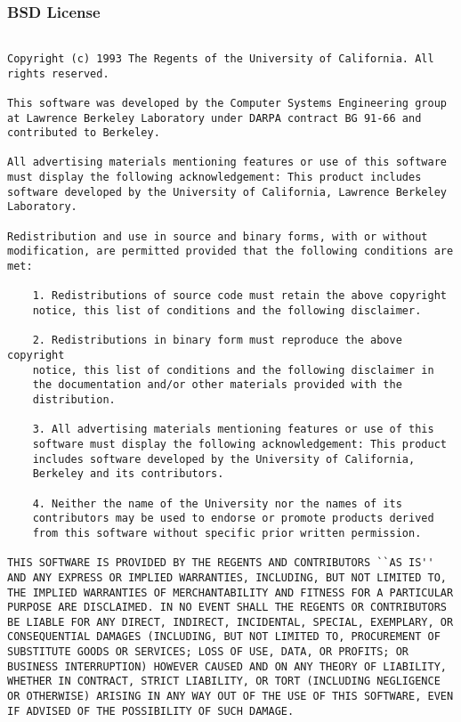 \newpage

\subsubsection{BSD License}

\begin{verbatim}

Copyright (c) 1993 The Regents of the University of California. All
rights reserved.

This software was developed by the Computer Systems Engineering group
at Lawrence Berkeley Laboratory under DARPA contract BG 91-66 and
contributed to Berkeley.

All advertising materials mentioning features or use of this software
must display the following acknowledgement: This product includes
software developed by the University of California, Lawrence Berkeley
Laboratory.

Redistribution and use in source and binary forms, with or without
modification, are permitted provided that the following conditions are
met:

    1. Redistributions of source code must retain the above copyright
    notice, this list of conditions and the following disclaimer.

    2. Redistributions in binary form must reproduce the above copyright
    notice, this list of conditions and the following disclaimer in
    the documentation and/or other materials provided with the
    distribution.

    3. All advertising materials mentioning features or use of this
    software must display the following acknowledgement: This product
    includes software developed by the University of California,
    Berkeley and its contributors.

    4. Neither the name of the University nor the names of its
    contributors may be used to endorse or promote products derived
    from this software without specific prior written permission.

THIS SOFTWARE IS PROVIDED BY THE REGENTS AND CONTRIBUTORS ``AS IS''
AND ANY EXPRESS OR IMPLIED WARRANTIES, INCLUDING, BUT NOT LIMITED TO,
THE IMPLIED WARRANTIES OF MERCHANTABILITY AND FITNESS FOR A PARTICULAR
PURPOSE ARE DISCLAIMED. IN NO EVENT SHALL THE REGENTS OR CONTRIBUTORS
BE LIABLE FOR ANY DIRECT, INDIRECT, INCIDENTAL, SPECIAL, EXEMPLARY, OR
CONSEQUENTIAL DAMAGES (INCLUDING, BUT NOT LIMITED TO, PROCUREMENT OF
SUBSTITUTE GOODS OR SERVICES; LOSS OF USE, DATA, OR PROFITS; OR
BUSINESS INTERRUPTION) HOWEVER CAUSED AND ON ANY THEORY OF LIABILITY,
WHETHER IN CONTRACT, STRICT LIABILITY, OR TORT (INCLUDING NEGLIGENCE
OR OTHERWISE) ARISING IN ANY WAY OUT OF THE USE OF THIS SOFTWARE, EVEN
IF ADVISED OF THE POSSIBILITY OF SUCH DAMAGE.

\end{verbatim}

